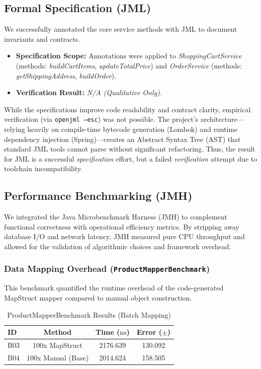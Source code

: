 \subsection{Formal Specification (JML)}
We successfully annotated the core service methods with JML to document invariants and contracts.
\begin{itemize}
    \item \textbf{Specification Scope:} Annotations were applied to \emph{ShoppingCartService} (methods: \emph{buildCartItems}, \emph{updateTotalPrice}) and \emph{OrderService} (methods: \emph{getShippingAddress}, \emph{buildOrder}).
    \item \textbf{Verification Result:} \textit{N/A (Qualitative Only)}.
\end{itemize}

While the specifications improve code readability and contract clarity, empirical verification (via \texttt{openjml --esc}) was not possible. The project's architecture—relying heavily on compile-time bytecode generation (Lombok) and runtime dependency injection (Spring)—creates an Abstract Syntax Tree (AST) that standard JML tools cannot parse without significant refactoring. Thus, the result for JML is a successful \textit{specification} effort, but a failed \textit{verification} attempt due to toolchain incompatibility.

\subsection{Performance Benchmarking (JMH)}
We integrated the Java Microbenchmark Harness (JMH) to complement functional correctness with operational efficiency metrics. By stripping away database I/O and network latency, JMH measured pure CPU throughput and allowed for the validation of algorithmic choices and framework overhead.

\subsubsection{Data Mapping Overhead (\texttt{ProductMapperBenchmark})}
This benchmark quantified the runtime overhead of the code-generated MapStruct mapper compared to manual object construction.

\begin{table}[H]
    \centering
    \begin{tabular}{l c c c}
        \toprule
        \textbf{ID} & \textbf{Method} & \textbf{Time ($\text{ns}$)} & \textbf{Error ($\pm$)} \\
        \midrule
        B03 & 100x MapStruct & 2176.639 & 130.092 \\
        B04 & 100x Manual (Base) & 2014.624 & 158.505 \\
        \bottomrule
    \end{tabular}
    \caption{ProductMapperBenchmark Results (Batch Mapping)}
    \label{tab:mapper_benchmark}
\end{table}

